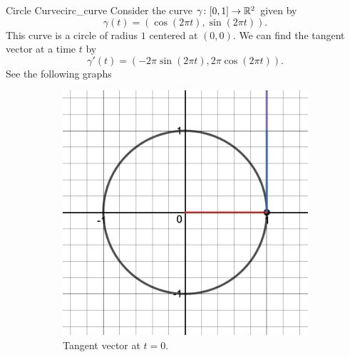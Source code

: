         \begin{ex}{Circle Curve}{circ_curve}
        Consider the curve $\gamma \colon [0,1] \to \mathbb{R}^2$ given by
        \[
        \gamma(t)=(\cos (2\pi t),\sin (2\pi t)).
        \]
        This curve is a circle of radius $1$ centered at $(0,0)$.  We can find the tangent vector at a time $t$ by
        \[
        \gamma'(t)=(-2\pi \sin(2\pi t), 2\pi \cos(2\pi t)).
        \]
        See the following graphs
        
    \begin{figure}[H]
    \centering
    \begin{subfigure}[h]{0.45\textwidth}
        \includegraphics[width=\textwidth]{Figures_Part_6/circ_tang_1.png}
        \caption{Tangent vector at $t=0$.}
    \end{subfigure}
    ~ 
    \begin{subfigure}[h]{0.45\textwidth}

\end{subfigure}
\end{figure}
\end{ex}
